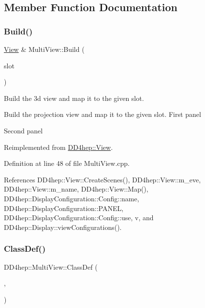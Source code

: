 \subsection{Member Function Documentation}
\hypertarget{class_d_d4hep_1_1_multi_view_a7343f8ab0d599e5ee1b9b471a12a00a8}{}\label{class_d_d4hep_1_1_multi_view_a7343f8ab0d599e5ee1b9b471a12a00a8} 
\subsubsection{\texorpdfstring{Build()}{Build()}}
{\footnotesize\ttfamily \hyperlink{class_d_d4hep_1_1_view}{View} \& Multi\+View\+::\+Build (\begin{DoxyParamCaption}\item[{T\+Eve\+Window $\ast$}]{slot }\end{DoxyParamCaption})\hspace{0.3cm}{\ttfamily [virtual]}}



Build the 3d view and map it to the given slot. 

Build the projection view and map it to the given slot. First panel

Second panel 

Reimplemented from \hyperlink{class_d_d4hep_1_1_view_ab4e12874a9cb6a599f268b027443c6ce}{D\+D4hep\+::\+View}.



Definition at line 48 of file Multi\+View.\+cpp.



References D\+D4hep\+::\+View\+::\+Create\+Scenes(), D\+D4hep\+::\+View\+::m\+\_\+eve, D\+D4hep\+::\+View\+::m\+\_\+name, D\+D4hep\+::\+View\+::\+Map(), D\+D4hep\+::\+Display\+Configuration\+::\+Config\+::name, D\+D4hep\+::\+Display\+Configuration\+::\+P\+A\+N\+EL, D\+D4hep\+::\+Display\+Configuration\+::\+Config\+::use, v, and D\+D4hep\+::\+Display\+::view\+Configurations().

\hypertarget{class_d_d4hep_1_1_multi_view_ae1b4bd4c3527dfe174acada259e6514c}{}\label{class_d_d4hep_1_1_multi_view_ae1b4bd4c3527dfe174acada259e6514c} 
\subsubsection{\texorpdfstring{Class\+Def()}{ClassDef()}}
{\footnotesize\ttfamily D\+D4hep\+::\+Multi\+View\+::\+Class\+Def (\begin{DoxyParamCaption}\item[{\hyperlink{class_d_d4hep_1_1_multi_view}{Multi\+View}}]{,  }\item[{0}]{ }\end{DoxyParamCaption})}



